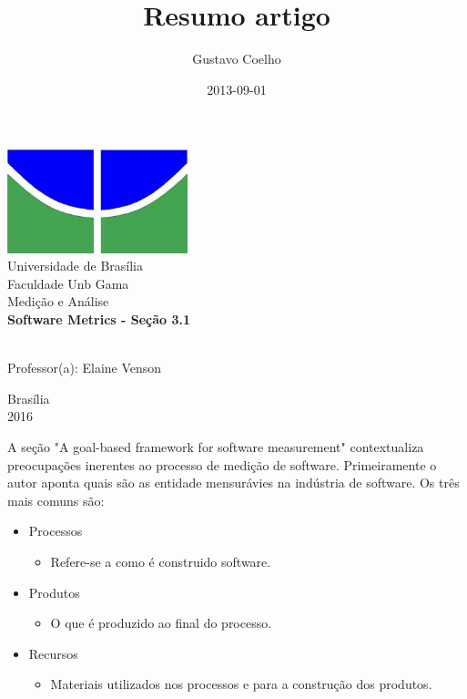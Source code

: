 \documentclass{article}
\title{Resumo artigo}
\date{2013-09-01}
\author{Gustavo Coelho}
\begin{document}
\begin{titlepage}
        \begin{center}
            \includegraphics[height=3cm]{logo.jpg}\\[0.3cm]
            {\large Universidade de Brasília}\\[0.2cm]
            {\large Faculdade Unb Gama}\\[0.2cm]
            {\large Medição e Análise}\\[4.1cm]
            {\bf \huge Software Metrics - Seção 3.1}\\[4.1cm]
        \end{center}
        \\[0.7cm]
        {\normalsize Professor(a): Elaine Venson}
        \vfill
        \begin{center}
            {\large Brasília}\\[0.2cm]
            {\large 2016}
        \end{center}
\end{titlepage}



\newpage
A seção "A goal-based framework for software measurement" contextualiza preocupações inerentes ao processo de medição de software. Primeiramente o autor aponta quais são as entidade mensurávies na indústria de software. Os três mais comuns são:
\begin{itemize}
\item    Processos
        \begin{itemize}
        \item[] Refere-se a como é construido software.
        \end{itemize}
\item    Produtos
        \begin{itemize}
        \item[] O que é produzido ao final do processo.
        \end{itemize}
\item    Recursos
        \begin{itemize}
        \item[] Materiais utilizados nos processos e para a construção dos produtos.
        \end{itemize}
\end{itemize}
\end{document}
